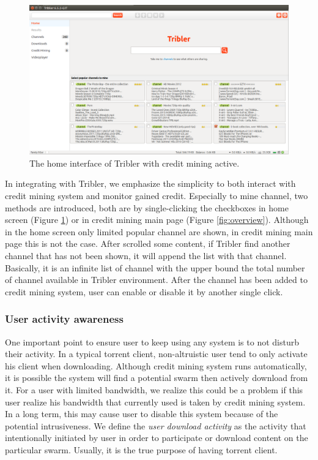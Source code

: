 \begin{figure}
	\includegraphics[width=\textwidth]{pics/home_channel.png}
	\caption{The home interface of Tribler with credit mining active.}
	\label{fig:homecm}
\end{figure}

In integrating with Tribler, we emphasize the simplicity to both interact with credit mining system and monitor gained credit. Especially to mine channel, two methods are introduced, both are by single-clicking the checkboxes in home screen (Figure \ref{fig:homecm}) or in credit mining main page (Figure \ref{fig:overview}). Although in the home screen only limited popular channel are shown, in credit mining main page this is not the case. After scrolled some content, if Tribler find another channel that has not been shown, it will append the list with that channel. Basically, it is an infinite list of channel with the upper bound the total number of channel available in Tribler environment. After the channel has been added to credit mining system, user can enable or disable it by another single click.

\subsubsection{User activity awareness}
\label{section:uactivityimpl}
One important point to ensure user to keep using any system is to not disturb their activity. In a typical torrent client, non-altruistic user tend to only activate his client when downloading. Although credit mining system runs automatically, it is possible the system will find a potential swarm then actively download from it. For a user with limited bandwidth, we realize this could be a problem if this user realize his bandwidth that currently used is taken by credit mining system. In a long term, this may cause user to disable this system because of the potential intrusiveness. We define the \textit{user download activity} as the activity that intentionally initiated by user in order to participate or download content on the particular swarm. Usually, it is the true purpose of having torrent client. 

